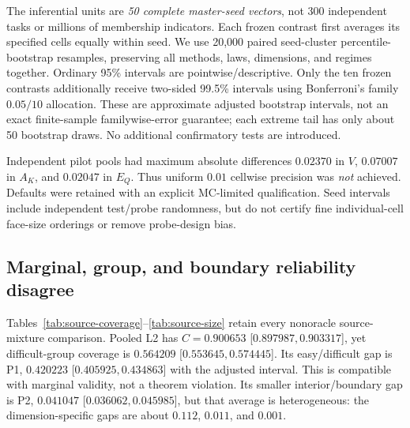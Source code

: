 \documentclass{article}
\theoremstyle{plain}
\begin{document}
The inferential units are \emph{50 complete master-seed vectors}, not 300 independent tasks or millions of membership indicators. Each frozen contrast first averages its specified cells equally within seed. We use 20,000 paired seed-cluster percentile-bootstrap resamples, preserving all methods, laws, dimensions, and regimes together. Ordinary 95\% intervals are pointwise/descriptive. Only the ten frozen contrasts additionally receive two-sided 99.5\% intervals using Bonferroni's family $0.05/10$ allocation. These are approximate adjusted bootstrap intervals, not an exact finite-sample familywise-error guarantee; each extreme tail has only about 50 bootstrap draws. No additional confirmatory tests are introduced.

Independent pilot pools had maximum absolute differences $0.02370$ in $V$, $0.07007$ in $A_K$, and $0.02047$ in $E_Q$. Thus uniform $0.01$ cellwise precision was \emph{not} achieved. Defaults were retained with an explicit MC-limited qualification. Seed intervals include independent test/probe randomness, but do not certify fine individual-cell face-size orderings or remove probe-design bias.

\begin{table}[t]
\caption{Source structural-zero mixture: all ten nonoracle methods, with equal dimension weights. Entries are mean simultaneous observed-composition coverage [pointwise descriptive 95\% CI]. Boundary is a realized-response diagnostic, not a calibrated observable group. Nominal level is $0.9$; larger is not automatically better if overconservative.}
\label{tab:source-coverage}
\centering

\end{table}

\begin{table}[t]
\caption{The same fitted source-mixture regions as Table~\ref{tab:source-coverage}: normalized reference masses [descriptive 95\% CI]. $V$ is ambient, $A_K$ is supported-face, and $E_Q$ uses \eqref{eq:Q}. Smaller denotes less reference mass, not improved reliability or utility. The CLR $10^{-6}$ ambient estimate is $0.999845$ [$0.999732,0.999931$], not exactly one; numerical saturation and zero hits remain MC-limited.}
\label{tab:source-size}
\centering

\end{table}

\subsection{Marginal, group, and boundary reliability disagree}
Tables~\ref{tab:source-coverage}--\ref{tab:source-size} retain every nonoracle source-mixture comparison. Pooled L2 has $C=0.900653$ [$0.897987,0.903317$], yet difficult-group coverage is $0.564209$ [$0.553645,0.574445$]. Its easy/difficult gap is P1, $0.420223$ [$0.405925,0.434863$] with the adjusted interval. This is compatible with marginal validity, not a theorem violation. Its smaller interior/boundary gap is P2, $0.041047$ [$0.036062,0.045985$], but that average is heterogeneous: the dimension-specific gaps are about $0.112$, $0.011$, and $0.001$.
\end{document}
